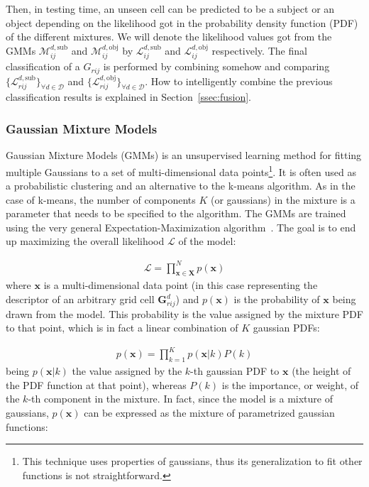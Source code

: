 \documentclass[10pt,twocolumn,letterpaper]{article}
\begin{document}
Then, in testing time, an unseen cell can be predicted to be a subject or an object depending on the likelihood got in the probability density function (PDF) of the different mixtures. We will denote the likelihood values got from the GMMs $\mathcal{M}_{ij}^{d,\mathrm{sub}}$ and $\mathcal{M}_{ij}^{d,\mathrm{obj}}$ by $\mathcal{L}_{ij}^{d,\mathrm{sub}}$ and $\mathcal{L}_{ij}^{d,\mathrm{obj}}$ respectively. The final classification of a $G_{rij}$ is performed by combining somehow and comparing $\{\mathcal{L}_{rij}^{d,\mathrm{sub}}\}_{\forall d \in \mathcal{D}}$ and $\{\mathcal{L}_{rij}^{d,\mathrm{obj}}\}_{\forall d \in \mathcal{D}}$. How to intelligently combine the previous classification results is explained in Section~\ref{ssec:fusion}.

\subsubsection{Gaussian Mixture Models} \label{section:gmm}

Gaussian Mixture Models (GMMs) is an unsupervised learning method for fitting multiple Gaussians to a set of multi-dimensional data points\footnote{This technique uses properties of gaussians, thus its generalization to fit other functions is not straightforward.}. It is often used as a probabilistic clustering and an alternative to the k-means algorithm. As in the case of k-means, the number of components $K$ (or gaussians) in the mixture is a parameter that needs to be specified to the algorithm. The GMMs are trained using the very general Expectation-Maximization algorithm~\cite{moon1996expectation}. The goal is to end up maximizing the overall likelihood $\mathcal{L}$ of the model:

\begin{gather}
	\mathcal{L} = \prod_{\mathbf{x} \in \mathbf{X}}^{N} p(\mathbf{x})
\end{gather}
where $\mathbf{x}$ is a multi-dimensional data point (in this case representing the descriptor of an arbitrary grid cell $\mathbf{G}_{rij}^{d}$) and $p(\mathbf{x})$ is the probability of $\mathbf{x}$ being drawn from the model. This probability is the value assigned by the mixture PDF to that point, which is in fact a linear combination of $K$ gaussian PDFs:

\begin{gather}
	p(\mathbf{x}) = \prod_{k=1}^{K} p(\mathbf{x}|k) P(k)
\end{gather}
being $p(\mathbf{x}|k)$ the value assigned by the $k$-th gaussian PDF to $\mathbf{x}$ (the height of the PDF function at that point), whereas $P(k)$ is the importance, or weight, of the $k$-th component in the mixture. In fact, since the model is a mixture of gaussians, $p(\mathbf{x})$ can be expressed as the mixture of parametrized gaussian functions:
\end{document}
